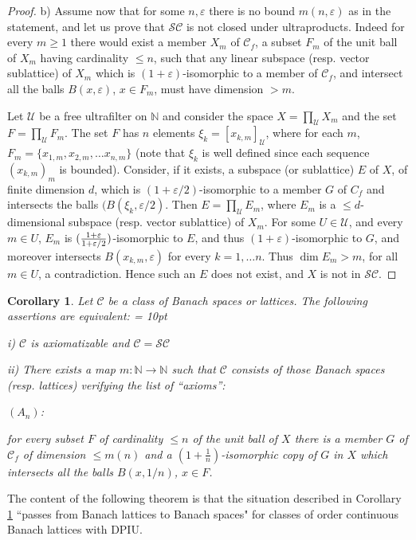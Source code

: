 \documentclass[11pt]{amsart}
\theoremstyle{plain}
\newtheorem{corollary}[theorem]{Corollary}
\theoremstyle{remark}
\newcommand{\C}{\mathcal C}
\newcommand{\U}{\mathcal U}
\newcommand{\eps}{\varepsilon}
\newcommand{\nat}{\mathbb N}
\begin{document}
\begin{proof}
b) Assume now that for some $n,\eps$ there is no bound $m(n,\eps)$ as in the statement, and let us prove that $\mathcal{SC}$ is not closed under ultraproducts. Indeed for every $m\ge 1$ there would exist a member $X_m$ of $\C_f$,  a subset $F_m$ of the unit ball of $X_m$ having cardinality $\leq n$, such that  any  linear subspace (resp. vector sublattice) of $X_m$  which is $(1+\eps)$-isomorphic to a member of $\C_f$, and intersect all the balls $B(x,\eps)$, $x\in F_m$, must have dimension $> m$.

Let $\U$ be a free ultrafilter on $\mathbb N$ and consider the space $X=\prod_\U X_m$ and the set $F= \prod_\U F_m$. The set $F$ has $n$ elements $\xi_k=[x_{k,m}]_\U$, where for each $m$, $F_m=\{x_{1,m}, x_{2,m},\dots x_{n,m}\}$ (note that $\xi_k$ is well defined since each sequence $(x_{k,m})_m$ is bounded). Consider, if it exists, a subspace (or sublattice) $E$ of $X$, of finite dimension $d$, which is $(1+\eps/2)$-isomorphic to a member $G$ of $C_f$ and intersects the balls $(B(\xi_k,\eps/2)$. Then $E=\prod_\U E_m$, where $E_m$ is a $\le d$-dimensional subspace (resp. vector sublattice) of $X_m$. For  some $U\in\U$, and every $m\in U$, $E_m$ is $({1+\eps\over 1+\eps/2})$-isomorphic to $E$, and thus  $(1+\eps)$-isomorphic to $G$, and  moreover intersects $B(x_{k,m},\eps)$ for every $k=1,\dots n$. Thus $\dim E_m> m$,  for all $m\in U$, a contradiction. Hence such an $E$ does not exist, and $X$ is not in $\mathcal{SC}$.
\end{proof}

\begin{corollary}\label{axioms}
Let $\C$ be a class of Banach spaces or lattices.
The following assertions are equivalent:
\parindent= 10pt

i) $\C$ is axiomatizable and $\C=\mathcal{SC}$

ii) There exists a map $m: \nat\to \nat$ such that $\C$ consists of those Banach spaces (resp. lattices) verifying the list of ``axioms'':

\vskip 3pt
$(A_n)$: \hfill\parbox[t]{13.5cm}{for every subset $F$ of cardinality $\le n$ of the unit ball of $X$ there is  a member $G$ of $\C_f$ of dimension  $\le m(n)$ and a $(1+\frac 1n)$-isomorphic copy of $G$ in $X$ which intersects all the balls $B(x,1/n)$, $x\in F$.}
\end{corollary}

The content of the following theorem is that the situation described in Corollary \ref{axioms} ``passes from Banach lattices to Banach spaces" for  classes of order continuous Banach lattices with DPIU.
\end{document}
